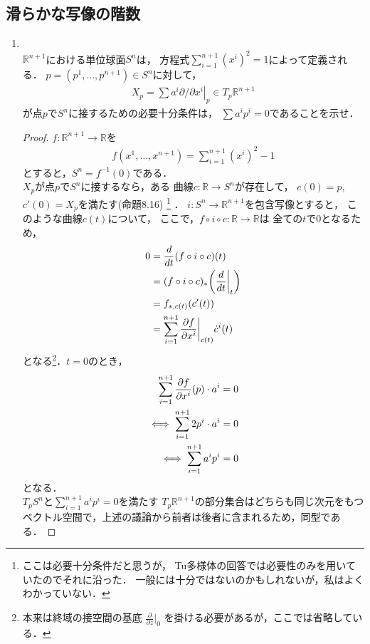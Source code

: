 \documentclass[dvipdfmx,a4paper,11pt]{jsarticle}
\begin{document}
\subsection{滑らかな写像の階数}
\begin{enumerate}
  \item {}\\
  $\mathbb{R}^{n+1}$における単位球面$S^n$は，
  方程式$\sum_{i=1}^{n+1}(x^i)^2=1$によって定義される．
  $p=(p^1,\dots,p^{n+1})\in S^n$に対して，
  \begin{align}
    X_p=\left.\sum a^i\partial/\partial x^i
    \right|_{p}\in T_p\mathbb{R}^{n+1}
  \end{align}
  が点$p$で$S^n$に接するための必要十分条件は，
  $\sum a^i p^i=0$であることを示せ．
  \begin{proof}
    $f\colon\mathbb{R}^{n+1}\to\mathbb{R}$を
    \begin{align}
      f(x^1,\dots,x^{n+1})=\sum_{i=1}^{n+1}(x^i)^2-1
    \end{align}
    とすると，$S^n=f^{-1}(0)$である．\\
    $X_p$が点$p$で$S^n$に接するなら，ある
    曲線$c\colon\mathbb{R}\to S^n$が存在して，
    $c(0)=p$, $c'(0)=X_p$を満たす(命題8.16)
    \footnote{
      ここは必要十分条件だと思うが，
      Tu多様体の回答では必要性のみを用いていたのでそれに沿った．
      一般には十分ではないのかもしれないが，私はよくわかっていない．
    }
    ．
    $i\colon S^n\to\mathbb{R}^{n+1}$を包含写像とすると，
    このような曲線$c(t)$について，
    ここで，$f\circ i\circ c\colon\mathbb{R}\to\mathbb{R}$は
    全ての$t$で0となるため，
    \begin{align}
      0&=\frac{d}{dt}(f\circ i\circ c)(t)\\
      &=(f\circ i\circ c)_*\qty(\frac{d}{dt}\bigg|_{t})\\
      &=f_{*,c(t)}\qty(c'(t))\\
      &=\sum_{i=1}^{n+1}
      \pdv{f}{x^i}\bigg|_{c(t)}\dot{c}^i(t)
    \end{align}
    となる\footnote{
      本来は終域の接空間の基底
      $\frac{\partial}{\partial z}\bigg|_0$
      を掛ける必要があるが，ここでは省略している．
    }．$t=0$のとき，
    \begin{align}
      \sum_{i=1}^{n+1}
      \pdv{f}{x^i}\qty(p)\cdot a^i&=0\\
      \iff
      \sum_{i=1}^{n+1}2p^i\cdot a^i&=0\\
      \iff
      \sum_{i=1}^{n+1}a^ip^i&=0
    \end{align}
    となる．\\
    $T_p S^n$と$\sum_{i=1}^{n+1}a^ip^i=0$を満たす
    $T_p\mathbb{R}^{n+1}$の部分集合はどちらも同じ次元をもつ
    ベクトル空間で，上述の議論から前者は後者に含まれるため，同型である．
  \end{proof}
\end{enumerate}
\end{document}
